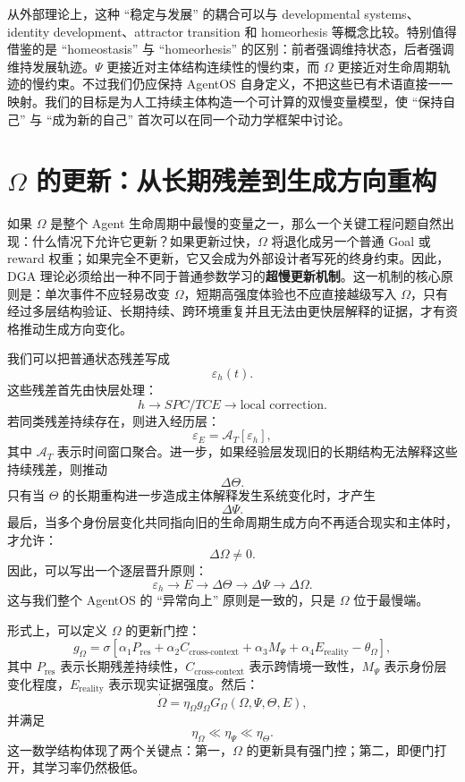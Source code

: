 从外部理论上，这种 ``稳定与发展'' 的耦合可以与 developmental systems、identity development、attractor transition 和 homeorhesis 等概念比较。特别值得借鉴的是 ``homeostasis'' 与 ``homeorhesis'' 的区别：前者强调维持状态，后者强调维持发展轨迹。$\Psi$ 更接近对主体结构连续性的慢约束，而 $\Omega$ 更接近对生命周期轨迹的慢约束。不过我们仍应保持 AgentOS 自身定义，不把这些已有术语直接一一映射。我们的目标是为人工持续主体构造一个可计算的双慢变量模型，使 ``保持自己'' 与 ``成为新的自己'' 首次可以在同一个动力学框架中讨论。

\section{$\Omega$ 的更新：从长期残差到生成方向重构}

如果 $\Omega$ 是整个 Agent 生命周期中最慢的变量之一，那么一个关键工程问题自然出现：什么情况下允许它更新？如果更新过快，$\Omega$ 将退化成另一个普通 Goal 或 reward 权重；如果完全不更新，它又会成为外部设计者写死的终身约束。因此，DGA 理论必须给出一种不同于普通参数学习的\textbf{超慢更新机制}。这一机制的核心原则是：单次事件不应轻易改变 $\Omega$，短期高强度体验也不应直接越级写入 $\Omega$，只有经过多层结构验证、长期持续、跨环境重复并且无法由更快层解释的证据，才有资格推动生成方向变化。

我们可以把普通状态残差写成
\[
\varepsilon_h(t).
\]
这些残差首先由快层处理：
\[
h
\rightarrow
SPC/TCE
\rightarrow
\text{local correction}.
\]
若同类残差持续存在，则进入经历层：
\[
\varepsilon_E
=
\mathcal A_T[\varepsilon_h],
\]
其中 $\mathcal A_T$ 表示时间窗口聚合。进一步，如果经验层发现旧的长期结构无法解释这些持续残差，则推动
\[
\Delta\Theta.
\]
只有当 $\Theta$ 的长期重构进一步造成主体解释发生系统变化时，才产生
\[
\Delta\Psi.
\]
最后，当多个身份层变化共同指向旧的生命周期生成方向不再适合现实和主体时，才允许：
\[
\Delta\Omega\neq0.
\]
因此，可以写出一个逐层晋升原则：
\[
\boxed{
\varepsilon_h
\rightarrow
E
\rightarrow
\Delta\Theta
\rightarrow
\Delta\Psi
\rightarrow
\Delta\Omega.
}
\]
这与我们整个 AgentOS 的 ``异常向上'' 原则是一致的，只是 $\Omega$ 位于最慢端。

形式上，可以定义 $\Omega$ 的更新门控：
\[
g_{\Omega}
=
\sigma
\left[
\alpha_1P_{\text{res}}
+
\alpha_2C_{\text{cross-context}}
+
\alpha_3M_{\Psi}
+
\alpha_4E_{\text{reality}}
-
\theta_{\Omega}
\right],
\]
其中 $P_{\text{res}}$ 表示长期残差持续性，$C_{\text{cross-context}}$ 表示跨情境一致性，$M_{\Psi}$ 表示身份层变化程度，$E_{\text{reality}}$ 表示现实证据强度。然后：
\[
\dot{\Omega}
=
\eta_{\Omega}
g_{\Omega}
G_{\Omega}
(\Omega,\Psi,\Theta,E),
\]
并满足
\[
\eta_{\Omega}
\ll
\eta_{\Psi}
\ll
\eta_{\Theta}.
\]
这一数学结构体现了两个关键点：第一，$\Omega$ 的更新具有强门控；第二，即便门打开，其学习率仍然极低。

